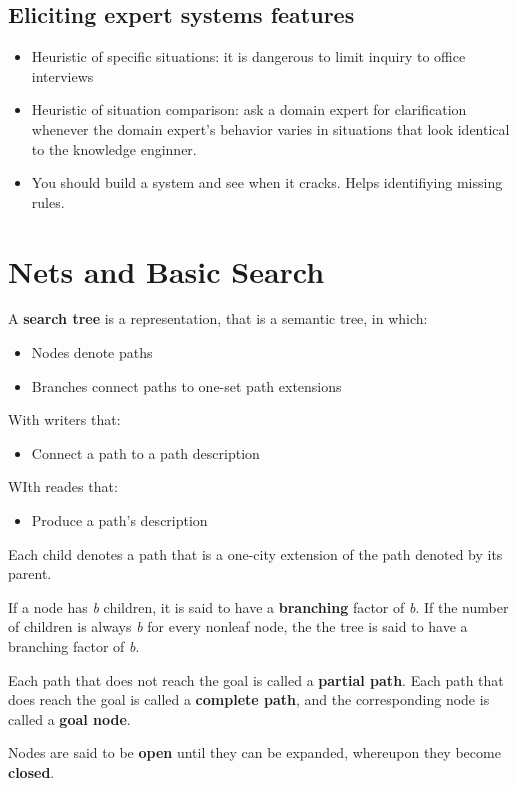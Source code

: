\documentclass{article}
\begin{document}
\subsection{Eliciting expert systems features}
\begin{itemize}
  \item Heuristic of specific situations: it is dangerous to limit inquiry to office interviews
  \item Heuristic of situation comparison: ask a domain expert for clarification whenever the domain expert's behavior varies in situations that look identical to the knowledge enginner.
  \item You should build a system and see when it cracks. Helps identifiying missing rules.
\end{itemize}

\section{Nets and Basic Search}

A \textbf{search tree} is a representation, that is a semantic tree, in which:
\begin{itemize}
  \item Nodes denote paths
  \item Branches connect paths to one-set path extensions
\end{itemize}
With writers that:
\begin{itemize}
  \item Connect a path to a path description
\end{itemize}
WIth reades that:
\begin{itemize}
  \item Produce a path's description
\end{itemize}

Each child denotes a path that is a one-city extension of the path denoted by its parent.

If a node has \textit{b} children, it is said to have a \textbf{branching}
factor of \textit{b}. If the number of children is always \textit{b}
for every nonleaf node, the the tree is said to have a branching 
factor of \textit{b}.

Each path that does not reach the goal is called a \textbf{partial path}.
Each path that does reach the goal is called a \textbf{complete path},
and the corresponding node is called a \textbf{goal node}.

Nodes are said to be \textbf{open} until they can be expanded,
whereupon they become \textbf{closed}.
\end{document}
